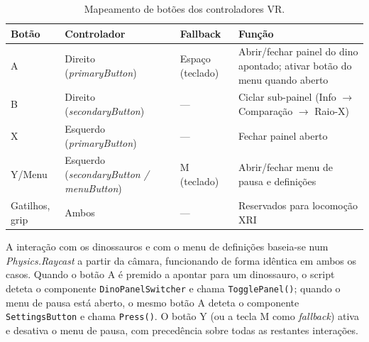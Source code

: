 \documentclass[a4paper,11pt]{report}
\newcommand{\code}[1]{\texttt{#1}}
\begin{document}
\begin{table}[H]
\centering
\begin{tabular}{llll}
\toprule
\textbf{Botão} & \textbf{Controlador} & \textbf{Fallback} & \textbf{Função} \\
\midrule
A & Direito (\textit{primaryButton})   & Espaço (teclado) & Abrir/fechar painel do dino apontado; ativar botão do menu quando aberto \\
B & Direito (\textit{secondaryButton}) & ---              & Ciclar sub-painel (Info $\to$ Comparação $\to$ Raio-X) \\
X & Esquerdo (\textit{primaryButton})  & ---              & Fechar painel aberto \\
Y/Menu & Esquerdo (\textit{secondaryButton / menuButton}) & M (teclado) & Abrir/fechar menu de pausa e definições \\
Gatilhos, grip & Ambos & ---  & Reservados para locomoção XRI \\
\bottomrule
\end{tabular}
\caption{Mapeamento de botões dos controladores VR.}
\label{tab:controls}
\end{table}

A interação com os dinossauros e com o menu de definições baseia-se num
\textit{Physics.Raycast} a partir da câmara, funcionando de forma idêntica
em ambos os casos. Quando o botão A é premido a apontar para um dinossauro,
o script deteta o componente \code{DinoPanelSwitcher} e chama
\code{TogglePanel()}; quando o menu de pausa está aberto, o mesmo botão A
deteta o componente \code{SettingsButton} e chama \code{Press()}. O botão Y
(ou a tecla M como \textit{fallback}) ativa e desativa o menu de pausa,
com precedência sobre todas as restantes interações.
\end{document}
